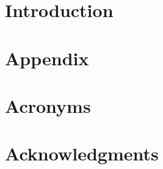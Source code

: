 \documentclass[
	english,%
	accentcolor=9c,%
	ruledheaders=chapter,%
	class=book,%
	thesis={%
		type=drfinal,
		dr=rernat
	},
	fontsize=11pt,%
	parskip=half-,%
	custommargins=true,%
	marginpar=false,%
]{tudapub}
\begin{document}
\tableofcontents

\mainmatter


\chapter{Introduction}











\appendix
\chapter{Appendix}


\chapter{Acronyms}


\cleardoublepage
\chapter*{Acknowledgments}

\clearpage

\newrefcontext[labelprefix=]
\printbibliography[notkeyword=myPapers]
\end{document}
